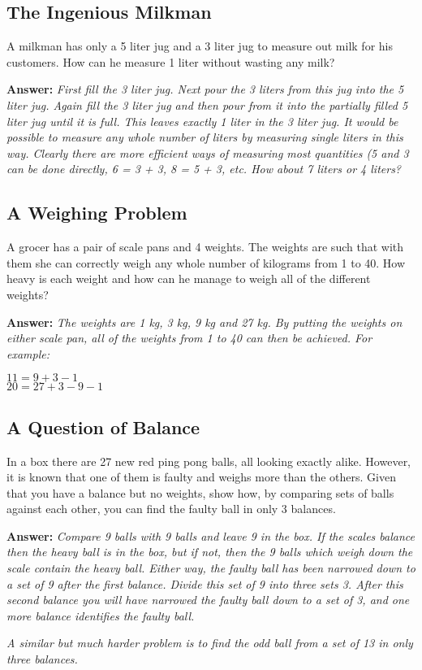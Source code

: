 	
	\subsection{The Ingenious Milkman}
	A milkman has only a 5 liter jug and a 3 liter jug to measure out milk for his customers. How can he measure 1 liter without wasting any milk?
	
	\textbf{Answer:} \emph{First fill the 3 liter jug. Next pour the 3 liters from this jug into the 5 liter jug. Again fill the 3 liter jug and then pour from it into the partially filled 5 liter jug until it is full. This leaves exactly 1 liter in the 3 liter jug. It would be possible to measure any whole number of liters by measuring single liters in this way. Clearly there are more efficient ways of measuring most quantities (5 and 3 can be done directly, 6 = 3 + 3, 8 = 5 + 3, etc. How about 7 liters or 4 liters?}
		
	\subsection{A Weighing Problem}
	A grocer has a pair of scale pans and 4 weights. The weights are such that with them she can correctly weigh any whole number of kilograms from 1 to 40. How heavy is each weight and how can he manage to weigh all of the different weights?
	
	\textbf{Answer:} \emph{The weights are 1 kg, 3 kg, 9 kg and 27 kg. By putting the weights on either scale pan, all of the weights from 1 to 40 can then be achieved. For example:}
	\begin{center}
	$11 = 9 + 3 - 1$\\
	
	$20 = 27 + 3 - 9 - 1$
	\end{center}
	
	\subsection{A Question of Balance}
	In a box there are 27 new red ping pong balls, all looking exactly alike. However, it is known that one of them is faulty and weighs more than the others. Given that you have a balance but no weights, show how, by comparing sets of balls against each other, you can find the faulty ball in only 3 balances.
	
	\textbf{Answer:} \emph{Compare 9 balls with 9 balls and leave 9 in the box. If the scales balance then the heavy ball is in the box, but if not, then the 9 balls which weigh down the scale contain the heavy ball. Either way, the faulty ball has been narrowed down to a set of 9 after the first balance. Divide this set of 9 into three sets 3. After this second balance you will have narrowed the faulty ball down to a set of 3, and one more balance identifies the faulty ball.}
	
	\emph{A similar but much harder problem is to find the odd ball from a set of 13 in only three balances.}